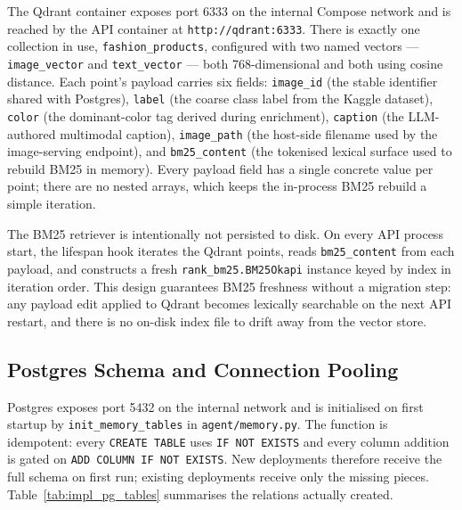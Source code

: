 The Qdrant container exposes port 6333 on the internal Compose network and is reached by the API container at \texttt{http://qdrant:6333}. There is exactly one collection in use, \texttt{fashion\_products}, configured with two named vectors --- \texttt{image\_vector} and \texttt{text\_vector} --- both 768-dimensional and both using cosine distance. Each point's payload carries six fields: \texttt{image\_id} (the stable identifier shared with Postgres), \texttt{label} (the coarse class label from the Kaggle dataset), \texttt{color} (the dominant-color tag derived during enrichment), \texttt{caption} (the LLM-authored multimodal caption), \texttt{image\_path} (the host-side filename used by the image-serving endpoint), and \texttt{bm25\_content} (the tokenised lexical surface used to rebuild BM25 in memory). Every payload field has a single concrete value per point; there are no nested arrays, which keeps the in-process BM25 rebuild a simple iteration.

The BM25 retriever is intentionally not persisted to disk. On every API process start, the lifespan hook iterates the Qdrant points, reads \texttt{bm25\_content} from each payload, and constructs a fresh \texttt{rank\_bm25.BM25Okapi} instance keyed by index in iteration order. This design guarantees BM25 freshness without a migration step: any payload edit applied to Qdrant becomes lexically searchable on the next API restart, and there is no on-disk index file to drift away from the vector store.

\subsection{Postgres Schema and Connection Pooling}

Postgres exposes port 5432 on the internal network and is initialised on first startup by \texttt{init\_memory\_tables} in \texttt{agent/memory.py}. The function is idempotent: every \texttt{CREATE TABLE} uses \texttt{IF NOT EXISTS} and every column addition is gated on \texttt{ADD COLUMN IF NOT EXISTS}. New deployments therefore receive the full schema on first run; existing deployments receive only the missing pieces. Table~\ref{tab:impl_pg_tables} summarises the relations actually created.


